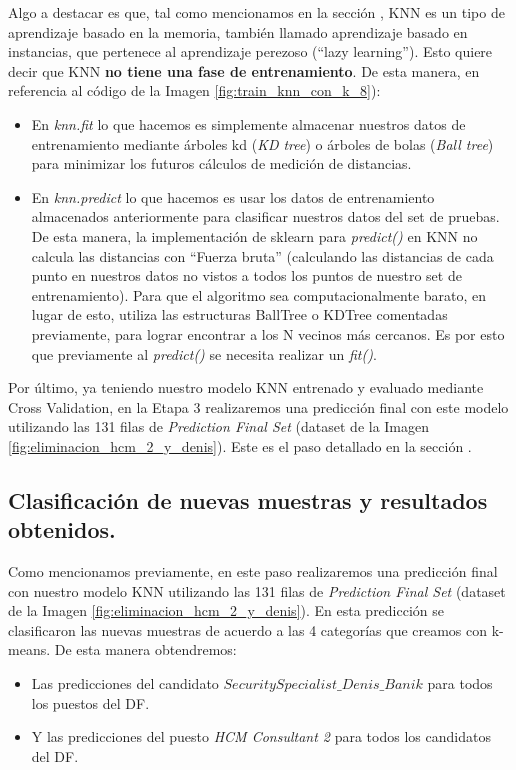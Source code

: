\documentclass[12pt,a4paper]{article}
\begin{document}
\begin{sloppypar}
Algo a destacar es que, tal como mencionamos en la sección \textit{}, KNN es un tipo de aprendizaje basado en la memoria, también llamado aprendizaje basado en instancias, que pertenece al aprendizaje perezoso (“lazy learning”). Esto quiere decir que KNN \textbf{no tiene una fase de entrenamiento}. De esta manera, en referencia al código de la Imagen \ref{fig:train_knn_con_k_8}):

\begin{itemize}

\item En \textit{knn.fit} lo que hacemos es simplemente almacenar nuestros datos de entrenamiento mediante árboles kd (\textit{KD tree}) o árboles de bolas (\textit{Ball tree}) para minimizar los futuros cálculos de medición de distancias. 

\item En \textit{knn.predict} lo que hacemos es usar los datos de entrenamiento almacenados anteriormente para clasificar nuestros datos del set de pruebas. De esta manera, la implementación de sklearn para \textit{predict()} en KNN no calcula las distancias con “Fuerza bruta” (calculando las distancias de cada punto en nuestros datos no vistos a todos los puntos de nuestro set de entrenamiento). Para que el algoritmo sea computacionalmente barato, en lugar de esto, utiliza las estructuras BallTree o KDTree comentadas previamente, para lograr encontrar a los N vecinos más cercanos. Es por esto que previamente al \textit{predict()} se necesita realizar un \textit{fit()}.

\end{itemize}

Por último, ya teniendo nuestro modelo KNN entrenado y evaluado mediante Cross Validation, en la Etapa 3 realizaremos una predicción final con este modelo utilizando las 131 filas de \textit{Prediction Final Set} (dataset de la Imagen \ref{fig:eliminacion_hcm_2_y_denis}). Este es el paso detallado en la sección \textit{}.

\cleardoublepage

\subsection{Clasificación de nuevas muestras y resultados obtenidos.}\label{5.4.Predicciondenuevasmuestrasyresultadosobtenidos}

Como mencionamos previamente, en este paso realizaremos una predicción final con nuestro modelo KNN utilizando las 131 filas de \textit{Prediction Final Set} (dataset de la Imagen \ref{fig:eliminacion_hcm_2_y_denis}). En esta predicción se clasificaron las nuevas muestras de acuerdo a las 4 categorías que creamos con k-means.
De esta manera obtendremos:
\begin{itemize}
\item Las predicciones del candidato \textit{$SecuritySpecialist\_Denis\_Banik$} para todos los puestos del DF.
\item Y las predicciones del puesto \textit{HCM Consultant 2} para todos los candidatos del DF.
\end{itemize}


\end{sloppypar}
\end{document}

